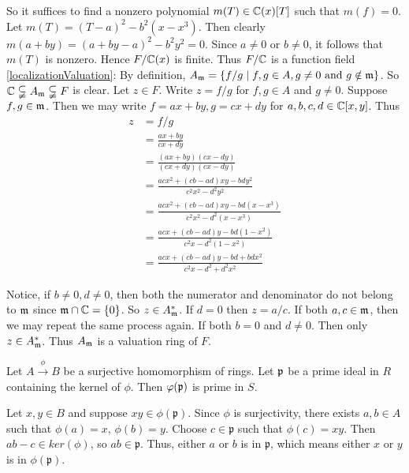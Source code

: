\begin{solution}
So it suffices to find a nonzero polynomial $m(T) \in \mathbb{C} (x)[T]$
such that $m(f) = 0$. Let $m(T) = (T-a)^{2} - b^2(x-x^3)$. Then 
clearly $m(a+by) = (a+by - a)^2 - b^2y^2 = 0$. Since $a \neq 0 $ 
or $b \neq 0$, it follows that $m(T)$ is nonzero. Hence
$F/\mathbb{C}(x)$ is finite. Thus $F/\mathbb{C}$ is a function field \\

\eqref{localizationValuation}: By definition, 
$A_{\mathfrak{m}} = \lbrace f/g \mid f,g \in A , g \neq 0 \text{ and } g \notin \mathfrak{m} \rbrace $.
So $\mathbb{C} \subsetneqq A_{\mathfrak{m}} \subsetneqq F$ is clear. Let $z \in F$. 
Write $z = f/g$ for $f,g \in A$ and $g \neq 0$. Suppose $f,g \in \mathfrak{m}$. 
Then we may write $f = ax+by,g = cx + dy$ for $a,b,c,d \in \mathbb{C}[x,y]$.
Thus
\begin{align*}
z &= f/g \\
&= \frac{ax+by}{cx + dy} \\
&= \frac{(ax+by)(cx - dy)}{(cx + dy)(cx - dy)} \\
&= \frac{acx^2 + (cb-ad)xy - bdy^2}{c^2x^2 -d^2y^2} \\
&= \frac{acx^2 + (cb-ad)xy - bd(x-x^3)}{c^2x^2 -d^2(x-x^3)} \\
&= \frac{acx + (cb-ad)y - bd(1-x^2)}{c^2x -d^2(1-x^2)} \\
&= \frac{acx + (cb-ad)y - bd + bdx^2}{c^2x -d^2 + d^2x^2} 
\end{align*}

Notice, if $b\neq 0, d \neq 0$, then both the numerator and denominator 
do not belong to
$\mathfrak{m}$ since $\mathfrak{m} \cap \mathbb{C} = \lbrace 0 \rbrace$. So $z \in A_{\mathfrak{m}}^*$.
If $d = 0$ then $z = a/c$. If both $a,c\in \mathfrak{m}$, then we
may repeat the same process again. If both $b = 0$ and $d \neq 0$. 
Then only $z \in A_{\mathfrak{m}}^*$. Thus $A_{\mathfrak{m}} $ is a valuation ring of $F$.
\end{solution}

\begin{exercise} \label{primeontoprime}
Let $A \stackrel{\phi}{\longrightarrow} B$ be a surjective homomorphism of rings. 
Let $\mathfrak{p} $ be a prime ideal in $R$ containing the kernel of $\phi$. 
Then $\varphi(\mathfrak{p})$ is prime in $S$.
\end{exercise}

\begin{solution} 
Let $x,y \in B$ and suppose $xy \in \phi(\mathfrak{p})$. Since $\phi$ is 
surjectivity, there exists $a, b \in A$ such that $\phi(a)= x$, $\phi(b)=y$. 
Choose $c \in \mathfrak{p}$ such that $\phi(c) = xy$.  
Then $ab -c \in ker(\phi)$, so $ab \in \mathfrak{p}$.  
Thus, either $a$ or $b$ is in $\mathfrak{p}$, which means 
either $x$ or $y$ is in $\phi(\mathfrak{p})$.
\end{solution}

